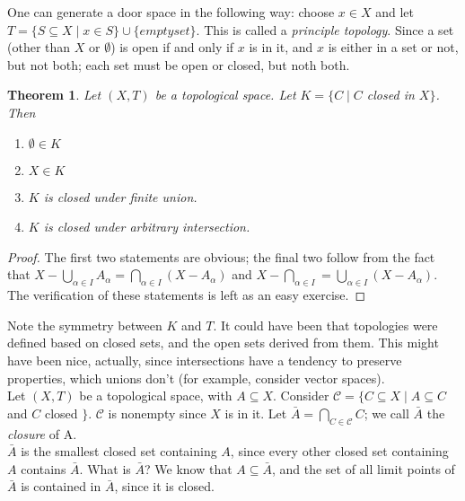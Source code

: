 \documentclass[12pt]{report}
\newcommand{\example}{  \noindent{\sc Example }\hspace{5pt} }
\newcommand{\define}{  \noindent{\sc Definition }\hspace{5pt} }
\newcommand{\unionover}[2]{\bigcup_{#1 \in #2 }}
\newcommand{\intover}[2]{\bigcap_{#1 \in #2}}
\newtheorem{theorem}{Theorem}[section]
\begin{document}
\example One can generate a door space in the following way: choose $x \in X$
and let $T = \{S \subseteq X \mid x \in S\} \cup \{emptyset\}$. This is called
a  {\em principle topology}. Since a set (other than
$X$ or $\emptyset$) is open if and only if $x$ is in it, and $x$ is either
in a set or not, but not both; each set must be open or closed, but noth both.
\\

\begin{theorem}
Let $(X,T)$ be a topological space. Let $K = \{C \mid C$ closed in $X \}$.
Then
\begin{enumerate}
\item $\emptyset \in K$
\item $X \in K$
\item $K$ is closed under finite union.
\item $K$ is closed under arbitrary intersection.
\end{enumerate}
\end{theorem}

\begin{proof}
The first two statements are obvious; the final two follow from the fact that
$X-\unionover{\alpha}{I}A_\alpha = \intover{\alpha}{I}(X-A_\alpha)$ and
$X-\intover{\alpha}{I}=\unionover{\alpha}{I}(X-A_\alpha)$. The verification of
these statements is left as an easy exercise.
\end{proof}

Note the symmetry between $K$ and $T$. It could have been that topologies were
defined based on closed sets, and the open sets derived from them. This might
have been nice, actually, since intersections have a tendency to preserve
properties, which unions don't (for example, consider vector spaces). \\

\define Let $(X, T)$ be a topological space, with $A \subseteq X$. Consider
$\mathcal{C} = \{ C \subseteq X \mid A \subseteq C$ and $C$ closed $\}$.
$\mathcal{C}$ is nonempty since $X$ is in it. Let $\bar{A} =
\intover{C}{\mathcal{C}}C$; we call $\bar{A}$  the {\em
closure} of A.\\

$\bar{A}$ is the smallest closed set containing $A$, since every other closed
set containing $A$ contains $\bar{A}$. What is $\bar{A}$? We know that $A
\subseteq \bar{A}$, and the set of all limit points of $\bar{A}$ is contained
in $\bar{A}$, since it is closed.
\end{document}
